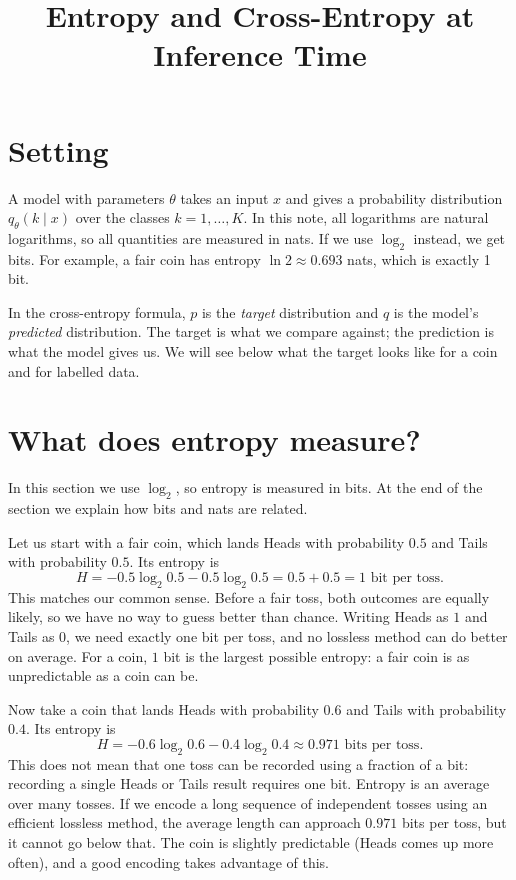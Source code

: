 \documentclass[12pt]{article}
\title{Entropy and Cross-Entropy at Inference Time}
\author{}
\date{}
\begin{document}
\maketitle
\vspace{-2.5em}

\section*{Setting}

A model with parameters $\theta$ takes an input $x$ and gives a
probability distribution $q_\theta(k \mid x)$ over the classes
$k = 1, \dots, K$. In this note, all logarithms are natural logarithms,
so all quantities are measured in nats. If we use $\log_2$ instead, we
get bits. For example, a fair coin has entropy
$\ln 2 \approx 0.693$ nats, which is exactly 1 bit.

In the cross-entropy formula, $p$ is the \emph{target} distribution and
$q$ is the model's \emph{predicted} distribution. The target is what we
compare against; the prediction is what the model gives us. We will see
below what the target looks like for a coin and for labelled data.

\section*{What does entropy measure?}

In this section we use $\log_2$, so entropy is measured in bits. At the
end of the section we explain how bits and nats are related.

Let us start with a fair coin, which lands Heads with probability
$0.5$ and Tails with probability $0.5$. Its entropy is
\begin{equation}
  H = -0.5\log_2 0.5 - 0.5\log_2 0.5
    = 0.5 + 0.5 = 1 \text{ bit per toss}.
  \label{eq:fair}
\end{equation}
This matches our common sense. Before a fair toss, both outcomes are
equally likely, so we have no way to guess better than chance. Writing
Heads as $1$ and Tails as $0$, we need exactly one bit per toss, and no
lossless method can do better on average. For a coin, $1$ bit is the
largest possible entropy: a fair coin is as unpredictable as a coin
can be.

Now take a coin that lands Heads with probability $0.6$ and Tails with
probability $0.4$. Its entropy is
\begin{equation}
  H = -0.6\log_2 0.6 - 0.4\log_2 0.4
    \approx 0.971 \text{ bits per toss}.
  \label{eq:biased}
\end{equation}
This does not mean that one toss can be recorded using a fraction of a
bit: recording a single Heads or Tails result requires one bit. Entropy
is an average over many tosses. If we encode a long sequence of
independent tosses using an efficient lossless method, the average
length can approach $0.971$ bits per toss, but it cannot go below that.
The coin is slightly predictable (Heads comes up more often), and a
good encoding takes advantage of this.
\end{document}
